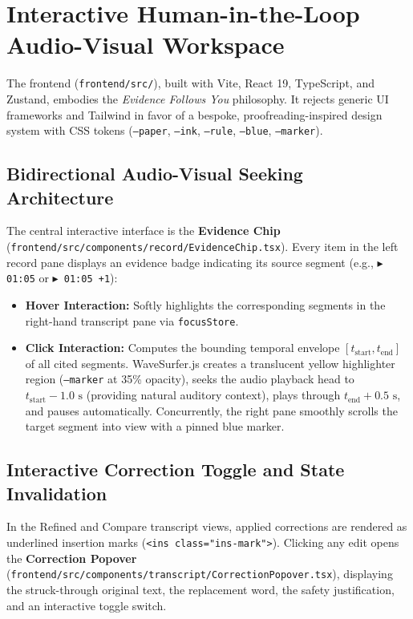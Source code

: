 \documentclass[10pt,a4paper]{article}
\begin{document}
\section{Interactive Human-in-the-Loop Audio-Visual Workspace}
\label{sec:frontend}

The frontend (\texttt{frontend/src/}), built with Vite, React 19, TypeScript, and Zustand, embodies the \textit{Evidence Follows You} philosophy. It rejects generic UI frameworks and Tailwind in favor of a bespoke, proofreading-inspired design system with CSS tokens (\texttt{--paper}, \texttt{--ink}, \texttt{--rule}, \texttt{--blue}, \texttt{--marker}).

\subsection{Bidirectional Audio-Visual Seeking Architecture}
The central interactive interface is the \textbf{Evidence Chip} (\texttt{frontend/src/components/record/EvidenceChip.tsx}). Every item in the left record pane displays an evidence badge indicating its source segment (e.g., \texttt{$\blacktriangleright$ 01:05} or \texttt{$\blacktriangleright$ 01:05 +1}):
\begin{itemize}
    \item \textbf{Hover Interaction:} Softly highlights the corresponding segments in the right-hand transcript pane via \texttt{focusStore}.
    \item \textbf{Click Interaction:} Computes the bounding temporal envelope $[t_{\text{start}}, t_{\text{end}}]$ of all cited segments. WaveSurfer.js creates a translucent yellow highlighter region (\texttt{--marker} at 35\% opacity), seeks the audio playback head to $t_{\text{start}} - 1.0\text{ s}$ (providing natural auditory context), plays through $t_{\text{end}} + 0.5\text{ s}$, and pauses automatically. Concurrently, the right pane smoothly scrolls the target segment into view with a pinned blue marker.
\end{itemize}

\subsection{Interactive Correction Toggle and State Invalidation}
In the Refined and Compare transcript views, applied corrections are rendered as underlined insertion marks (\texttt{<ins class="ins-mark">}). Clicking any edit opens the \textbf{Correction Popover} (\texttt{frontend/src/components/transcript/CorrectionPopover.tsx}), displaying the struck-through original text, the replacement word, the safety justification, and an interactive toggle switch.
\end{document}
